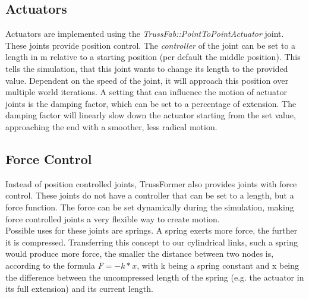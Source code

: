 \subsection{Actuators}
Actuators are implemented using the \textit{TrussFab::PointToPointActuator} joint. These joints provide position control. The \textit{controller} of the joint can be set to a length in m relative to a starting position (per default the middle position). This tells the simulation, that this joint wants to change its length to the provided value. Dependent on the speed of the joint, it will approach this position over multiple world iterations. A setting that can influence the motion of actuator joints is the damping factor, which can be set to a percentage of extension. The damping factor will linearly slow down the actuator starting from the set value, approaching the end with a smoother, less radical motion.

\subsection{Force Control}
Instead of position controlled joints, TrussFormer also provides joints with force control. These joints do not have a controller that can be set to a length, but a force function. The force can be set dynamically during the simulation, making force controlled joints a very flexible way to create motion.\\
Possible uses for these joints are springs. A spring exerts more force, the further it is compressed. Transferring this concept to our cylindrical links, such a spring would produce more force, the smaller the distance between two nodes is, according to the formula $F = -k * x$, with k being a spring constant and x being the difference between the uncompressed length of the spring (e.g. the actuator in its full extension) and its current length.


